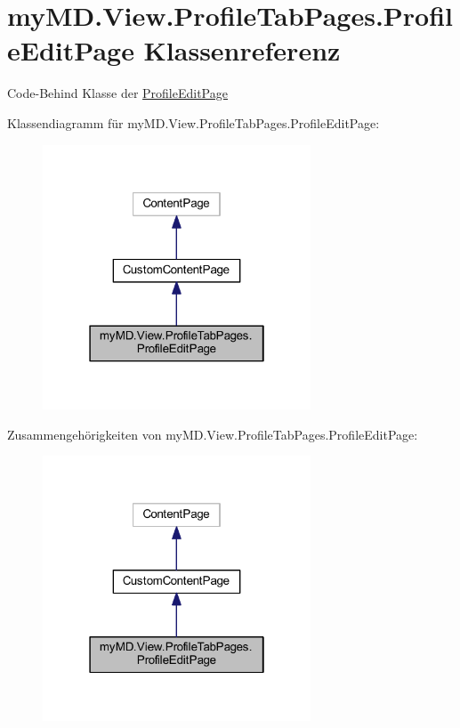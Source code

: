 \hypertarget{classmy_m_d_1_1_view_1_1_profile_tab_pages_1_1_profile_edit_page}{}\section{my\+M\+D.\+View.\+Profile\+Tab\+Pages.\+Profile\+Edit\+Page Klassenreferenz}
\label{classmy_m_d_1_1_view_1_1_profile_tab_pages_1_1_profile_edit_page}


Code-\/\+Behind Klasse der \mbox{\hyperlink{classmy_m_d_1_1_view_1_1_profile_tab_pages_1_1_profile_edit_page}{Profile\+Edit\+Page}}  




Klassendiagramm für my\+M\+D.\+View.\+Profile\+Tab\+Pages.\+Profile\+Edit\+Page\+:\nopagebreak
\begin{figure}[H]
\begin{center}
\leavevmode
\includegraphics[width=226pt]{classmy_m_d_1_1_view_1_1_profile_tab_pages_1_1_profile_edit_page__inherit__graph}
\end{center}
\end{figure}


Zusammengehörigkeiten von my\+M\+D.\+View.\+Profile\+Tab\+Pages.\+Profile\+Edit\+Page\+:\nopagebreak
\begin{figure}[H]
\begin{center}
\leavevmode
\includegraphics[width=226pt]{classmy_m_d_1_1_view_1_1_profile_tab_pages_1_1_profile_edit_page__coll__graph}
\end{center}
\end{figure}
